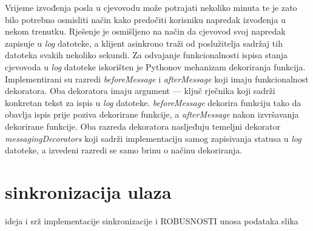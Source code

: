    
Vrijeme izvođenja posla u cjevovodu može potrajati nekoliko minuta te je zato
bilo potrebno osmisliti način kako predočiti korisniku napredak izvođenja u
nekom trenutku. Rješenje je osmišljeno na način da cjevovod svoj napredak
zapisuje u \emph{log} datoteke, a klijent asinkrono traži od poslužitelja
sadržaj tih datoteka svakih nekoliko sekundi. Za odvajanje funkcionalnosti
ispisa stanja cjevovoda u \emph{log} datoteke iskorišten je Pythonov mehanizam
dekoriranja funkcija. Implementirani su razredi \emph{beforeMessage} i
\emph{afterMessage} koji imaju funkcionalnost dekoratora. Oba dekoratora imaju
argument --- ključ rječnika koji sadrži konkretan tekst za ispis u \emph{log}
datoteke. \emph{beforeMessage} dekorira funkciju tako da obavlja ispis prije
poziva dekorirane funkcije, a \emph{afterMessage} nakon izvršavanja dekorirane
funkcije. Oba razreda dekoratora nasljeđuju temeljni dekorator
\emph{messagingDecorators} koji sadrži implementaciju samog zapisivanja statusa
u \emph{log} datoteke, a izvedeni razredi se samo brinu o načinu dekoriranja.


\section{sinkronizacija ulaza}
\label{sec:input}

ideja i srž implementacije sinkronizacije i ROBUSNOSTI unosa podataka
slika
